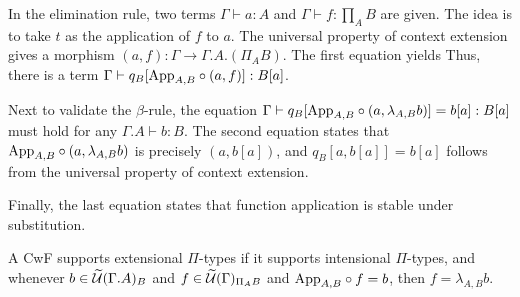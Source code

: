\documentclass{amsart}
\begin{document}
In the elimination rule, two terms $\Gamma \vdash a : A$ and $\Gamma \vdash f : \prod_{A}B$ are given.
The idea is to take $t$ as the application of $f$ to $a$.
The universal property of context extension gives a morphism $(a, f) : \Gamma \to \Gamma.A.(\Pi_{A}B)$.
The first equation yields 
Thus, there is a term $\Gamma \vdash q_{B}[\mathrm{App}_{A,B} \circ (a,f)] : B[a]$.

Next to validate the $\beta$-rule, the equation $\Gamma \vdash q_{B}[\mathrm{App}_{A,B} \circ (a,\lambda_{A,B}b)] = b[a] : B[a]$ must hold for any $\Gamma.A \vdash b : B$.
The second equation states that $\mathrm{App}_{A,B} \circ (a,\lambda_{A,B}b)$ is precisely $(a,b[a])$, and $q_{B}[a,b[a]] = b[a]$ follows from the universal property of context extension.

Finally, the last equation states that function application is stable under substitution.

\begin{defn}
  A CwF supports extensional $\Pi$-types if it supports intensional $\Pi$-types, and whenever $b \in \widetilde{\mathcal{U}}(\Gamma.A)_{B}$ and $f \in \widetilde{\mathcal{U}}(\Gamma)_{\Pi_{A}B}$ and $\mathrm{App}_{A,B} \circ f = b$, then $f = \lambda_{A,B}b$.
\end{defn}
\end{document}
